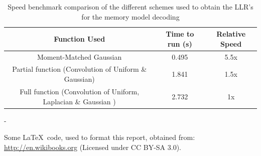 \documentclass[11pt]{article}
\numberwithin{equation}{subsection}
\begin{document}
\begin{table}[ht]
\caption{Speed benchmark comparison of the different schemes used to obtain the LLR's for the memory model decoding}
\centering
\doublespacing
\begin{tabular}{| c | c | c |}
\hline
Function Used & Time to run (s) & Relative Speed \\
\hline
Moment-Matched Gaussian & 0.495 & 5.5x \\
Partial function (Convolution of Uniform \& Gaussian) & 1.841 & 1.5x \\
Full function (Convolution of Uniform, Laplacian \& Gaussian \cite{hachem}) & 2.732 & 1x \\
\hline
\end{tabular}
\end{table}

\printbibliography
\begin{center}
-
\end{center}
Some \LaTeX\ code, used to format this report, obtained from: \url{http://en.wikibooks.org} (Licensed under CC BY-SA 3.0).


\end{document}
